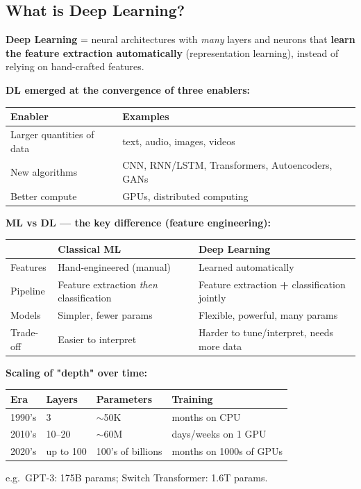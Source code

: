 \documentclass[10pt,a4paper]{article}
\begin{document}
	\subsection{What is Deep Learning?}

	\begin{definitionbox}
		\textbf{Deep Learning} = neural architectures with \emph{many} layers and neurons that \textbf{learn the feature extraction automatically} (representation learning), instead of relying on hand-crafted features.
	\end{definitionbox}

	\textbf{DL emerged at the convergence of three enablers:}
	\begin{center}
		\begin{tabular}{ll}
			\toprule
			Enabler & Examples \\
			\midrule
			Larger quantities of data & text, audio, images, videos \\
			New algorithms            & CNN, RNN/LSTM, Transformers, Autoencoders, GANs \\
			Better compute            & GPUs, distributed computing \\
			\bottomrule
		\end{tabular}
	\end{center}

	\textbf{ML vs DL --- the key difference (feature engineering):}
	\begin{center}
		\begin{tabular}{p{3.2cm} p{5.2cm} p{5.2cm}}
			\toprule
			& Classical ML & Deep Learning \\
			\midrule
			Features      & Hand-engineered (manual) & Learned automatically \\
			Pipeline      & Feature extraction \emph{then} classification & Feature extraction \textbf{+} classification jointly \\
			Models        & Simpler, fewer params & Flexible, powerful, many params \\
			Trade-off     & Easier to interpret & Harder to tune/interpret, needs more data \\
			\bottomrule
		\end{tabular}
	\end{center}

	\textbf{Scaling of "depth" over time:}
	\begin{center}
		\begin{tabular}{llll}
			\toprule
			Era & Layers & Parameters & Training \\
			\midrule
			1990's & 3        & $\sim$50K          & months on CPU \\
			2010's & 10--20   & $\sim$60M          & days/weeks on 1 GPU \\
			2020's & up to 100& 100's of billions  & months on 1000s of GPUs \\
			\bottomrule
		\end{tabular}
	\end{center}
	\footnotesize e.g.\ GPT-3: 175B params; Switch Transformer: 1.6T params.\normalsize
\end{document}

